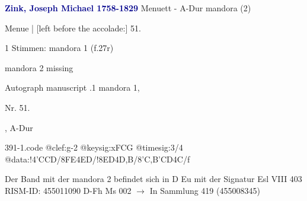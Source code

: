 \documentclass[twocolumn]{book}
\begin{document}
\newline \par \vspace{7pt} \textcolor{darkblue}{\textbf{Zink, Joseph Michael  1758-1829}}
\newline Menuett - A-Dur
\newline mandora (2)
\newline \begin{itshape}[f.27r, at left:] Menue | [left before the accolade:] 51.\end{itshape} 
\newline \textcolor{darkblue}{}  1 Stimmen: mandora 1  (f.27r)
\newline \begin{small} mandora 2 missing\end{small} 
\newline Autograph manuscript
.1  mandora 1, \begin{itshape}Nr. 51.\end{itshape}, A-Dur  
\begin{filecontents*}{391-1.code}
@clef:g-2
@keysig:xFCG
@timesig:3/4
@data:!4'CCD/{8FE}4ED/!{8ED}4D,B/{8'C,B}{'CD}4C/f
\end{filecontents*}
\newline
%
\newline Der Band mit der mandora 2 befindet sich in D Eu mit der Signatur Esl VIII 403
\newline RISM-ID: 455011090
\newline D-Fh  Ms 002
\newline $\rightarrow$ In Sammlung 419 (455008345)
      
\end{document}
